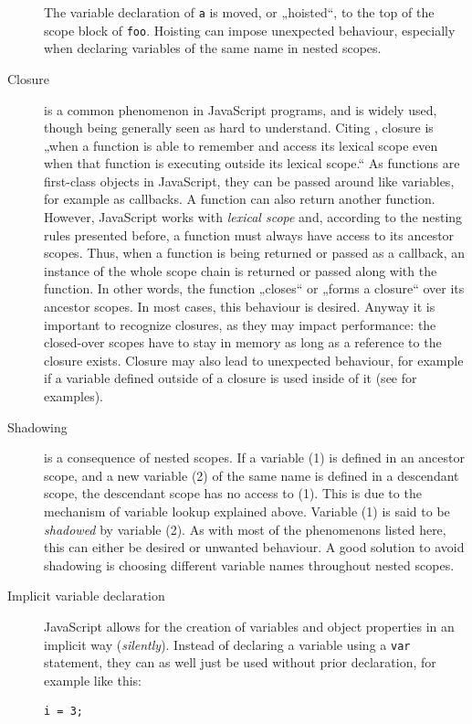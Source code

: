 \begin{description}
The variable declaration of \texttt{a} is moved, or „hoisted“, to the
top of the scope block of \texttt{foo}. Hoisting can impose unexpected
behaviour, especially when declaring variables of the same name in
nested scopes.
\item[Closure]
is a common phenomenon in JavaScript programs, and is widely used,
though being generally seen as hard to understand. Citing
, closure is „when a function is able to remember and
access its lexical scope even when that function is executing outside
its lexical scope.“ \citeyear{getify} As functions are first-class
objects in JavaScript, they can be passed around like variables, for
example as callbacks. A function can also return another function.
However, JavaScript works with \emph{lexical scope} and, according to
the nesting rules presented before, a function must always have access
to its ancestor scopes. Thus, when a function is being returned or
passed as a callback, an instance of the whole scope chain is returned
or passed along with the function. In other words, the function „closes“
or „forms a closure“ over its ancestor scopes. In most cases, this
behaviour is desired. Anyway it is important to recognize closures, as
they may impact performance: the closed-over scopes have to stay in
memory as long as a reference to the closure exists. Closure may also
lead to unexpected behaviour, for example if a variable defined outside
of a closure is used inside of it (see  for
examples).
\item[Shadowing]
is a consequence of nested scopes. If a variable (1) is defined in an
ancestor scope, and a new variable (2) of the same name is defined in a
descendant scope, the descendant scope has no access to (1). This is due
to the mechanism of variable lookup explained above. Variable (1) is
said to be \emph{shadowed} by variable (2). As with most of the
phenomenons listed here, this can either be desired or unwanted
behaviour. A good solution to avoid shadowing is choosing different
variable names throughout nested scopes.
\item[Implicit variable declaration]
JavaScript allows for the creation of variables and object properties in
an implicit way (\emph{silently}). Instead of declaring a variable using
a \texttt{var} statement, they can as well just be used without prior
declaration, for example like this:

\begin{verbatim}
i = 3;
\end{verbatim}


\end{description}
